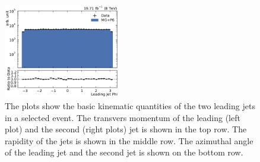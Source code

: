 \begin{figure}[htbp]
    \includegraphics[width=0.45\textwidth]{figures/measurement/jet2phi_default.pdf}
    \caption[Control plots of kinematic quantities of the dijet system]{The plots show the basic kinematic quantities of the two leading jets in a selected event.
             The transvers momentum of the leading (left plot) and the second (right plots) jet is shown
         in the top row. The rapidity of the jets is shown in the middle row. The azimuthal angle of the
     leading jet and the second jet is shown on the bottom row.}
    \label{fig:controlplots:kinematic}
\end{figure}

